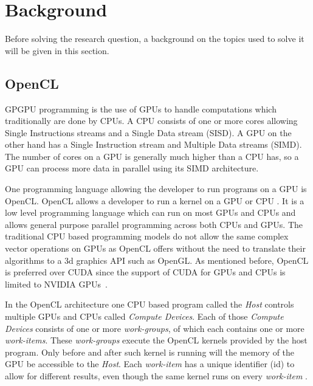 \section{Background}
Before solving the research question, a background on the topics used to solve it will be given in this section.

\subsection{OpenCL}
GPGPU programming is the use of GPUs to handle computations which traditionally are done by CPUs.
A CPU consists of one or more cores allowing Single Instructions streams and a Single Data stream (SISD).
A GPU on the other hand has a Single Instruction stream and Multiple Data streams (SIMD).
The number of cores on a GPU is generally much higher than a CPU has, so a GPU can process more data in parallel using its SIMD architecture.

One programming language allowing the developer to run programs on a GPU is OpenCL.
OpenCL allows a developer to run a kernel on a GPU or CPU \cite{OpenCL}.
It is a low level programming language which can run on most GPUs and CPUs and allows general purpose parallel programming across both CPUs and GPUs.
The traditional CPU based programming models do not allow the same complex vector operations on GPUs as OpenCL offers without the need to translate their algorithms to a 3d graphics API such as OpenGL.
As mentioned before, OpenCL is preferred over CUDA since the support of CUDA for GPUs and CPUs is limited to NVIDIA GPUs~\cite{CUDA}.

In the OpenCL architecture one CPU based program call\-ed the \textit{Host} controls multiple GPUs and CPUs called \textit{Compute Devices}.
Each of those \textit{Compute Devices} consists of one or more \textit{work-groups}, of which each contains one or more \textit{work-items}.
These \textit{work-groups} execute the OpenCL kernels provided by the host program.
Only before and after such kernel is running will the memory of the GPU be accessible to the \textit{Host}.
Each \textit{work-item} has a unique identifier (id) to allow for different results, even though the same kernel runs on every \textit{work-item} \cite{OpenCL}.

\begin{comment}
The memory hierarchy used in OpenCL is not equal to that of the physical memory configuration on GPUs.
This is to prevent having to take into account every type of architecture, which would be tedious work as the amount of types is quite large.
Each of the architectural devices discussed above have their own memory, which is inaccessible to components of the same type.
Every processing element can access its own private memory, the memory of its compute unit, the memory of its compute device.
The host memory can be accessed, but it is generally slower than the on-board memory \cite{OpenCL}.

The architecture and memory hierarchy already enforce the division of the algorithm if one wants to use every component of a GPU.
\end{comment}

